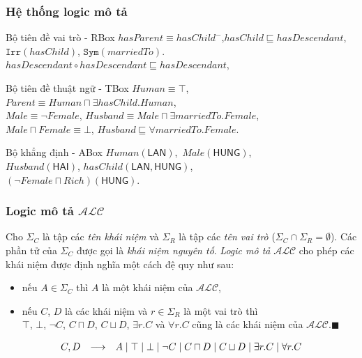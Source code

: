 \documentclass[fleqn]{beamer}
\newcommand{\SigmaC}	{\Sigma_C}
\newcommand{\SigmaR}	{\Sigma_R}
\newcommand{\ALC}		{$\mathcal{ALC}$\xspace}
\newcommand{\Irr}			{\mathtt{Irr}}
\newcommand{\Sym}			{\mathtt{Sym}}
\newcommand{\myend}		{\mbox{}\hfill\mbox{{\tiny$\!\blacksquare$}}}
\newcommand{\mand}		{\sqcap}
\newcommand{\mor}		{\sqcup}
\newcommand{\V}			{\forall}
\newcommand{\E}			{\exists}
\newcommand{\Human}			{Human}
\newcommand{\Female}		{Female}
\newcommand{\Male}			{Male}
\newcommand{\Rich}			{Rich}
\newcommand{\Parent}		{Parent}
\newcommand{\Husband}		{Husband}
\newcommand{\hasChild}		{hasChild}
\newcommand{\hasParent}		{hasParent}
\newcommand{\marriedTo}		{marriedTo}
\newcommand{\hasDescendant}	{hasDescendant}
\newcommand{\iLAN}		{\mathsf{LAN}}
\newcommand{\iHUNG}		{\mathsf{HUNG}}
\newcommand{\iHAI}		{\mathsf{HAI}}
\begin{document}
\begin{frame}\frametitle{\bf Hệ thống logic mô tả}
	\begin{block}{Bộ tiên đề vai trò - RBox}
		$\hasParent \equiv \hasChild^-$,\qquad\qquad$\hasChild \sqsubseteq \hasDescendant$,\\[0.5ex]
		$\Irr(\hasChild)$,\qquad\qquad\qquad\qquad
		$\Sym(\marriedTo)$.
		$\hasDescendant \circ \hasDescendant \sqsubseteq \hasDescendant$,\\[0.5ex]
	\end{block}
	
	\begin{block}{Bộ tiên đề thuật ngữ - TBox}
		$\Human \equiv \top$,\qquad\qquad\quad\,
		$\Parent \equiv \Human \mand \E \hasChild.\Human$,\\[0.5ex]
		$\Male \equiv \neg \Female$,\qquad\qquad\!\!\!\!\!
		$\Husband \equiv \Male \mand \E \marriedTo.\Female$,\\[0.5ex]
		$\Male \mand \Female \equiv \bot$, \qquad
		$\Husband \sqsubseteq \V \marriedTo.\Female$.
	\end{block}
	
	\begin{block}{Bộ khẳng định - ABox}
		$\Human(\iLAN)$,\qquad\qquad\qquad\,
		$\Male(\iHUNG)$,\\[0.5ex]
		$\Husband(\iHAI)$,\qquad\qquad\qquad
		$\hasChild(\iLAN, \iHUNG)$,\\[0.5ex]
		$(\neg \Female \mand \Rich)(\iHUNG)$.
	\end{block}
\end{frame}
\begin{frame}\frametitle{\bf Logic mô tả \ALC}
	\begin{definition}[Cú pháp của \ALC]
		\label{ALC-Syntax}
		Cho $\SigmaC$ là tập các {\em tên khái niệm} và $\SigmaR$ là tập các {\em tên vai trò} ($\SigmaC \cap \SigmaR = \emptyset$). Các phần tử của $\SigmaC$ được gọi là {\em khái niệm nguyên tố}. {\em Logic mô tả} \ALC cho phép các khái niệm được định nghĩa một cách đệ quy như sau:
		
		\begin{itemize}
			\item nếu $A \in \SigmaC$ thì $A$ là một khái niệm của \ALC,
			\item nếu $C$, $D$ là các khái niệm và $r \in \SigmaR$ là một vai trò thì\\ $\top$, $\bot$, $\neg C$, $C \mand D$, $C \mor D$, $\E r.C$ và $\V r.C$ cũng là các khái niệm của \ALC.\myend
		\end{itemize}
	\end{definition}
	
	\[
	\begin{array}{r c l}
	C, D & \longrightarrow&
	A \mid 
	\top \mid 
	\bot \mid 
	\neg C \mid 
	C\mand D \mid 
	C \mor D \mid 
	\E r.C \mid
	\V r.C
	\end{array}
	\]
\end{frame}
\end{document}
